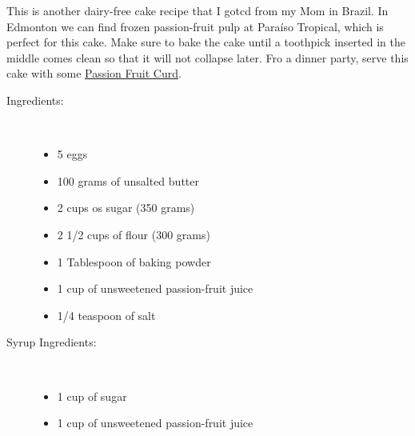 \documentclass[11pt,letterpaper]{article}
\begin{document}


This is another dairy-free cake recipe that I gotcd from my Mom in Brazil. In Edmonton we can find frozen passion-fruit pulp at Para\'iso Tropical, which is perfect for this cake. Make sure to bake the cake until a toothpick inserted in the middle comes clean so that it will not collapse later. Fro a dinner party, serve this cake with some \href{PassionFruitCurd.html}{Passion Fruit Curd}.

\vspace{0.3in}
\begin{description}

\item[Ingredients:]\ \\
	\begin{itemize}
	\item 5 eggs
	\item 100 grams of unsalted butter
	\item 2 cups os sugar (350 grams)
	\item 2  1/2 cups of flour (300 grams)
	\item 1 Tablespoon of baking powder
	\item 1 cup of unsweetened passion-fruit juice
	\item 1/4 teaspoon of salt
	\end{itemize}

\item[Syrup Ingredients:]\ \\
	\begin{itemize}
	\item 1 cup of sugar
	\item 1 cup of unsweetened passion-fruit juice
	\end{itemize}


\end{description}
\end{document}
